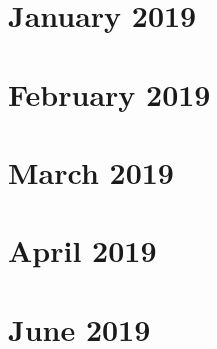 \chapter{January 2019}












\chapter{February 2019}





\chapter{March 2019}



\chapter{April 2019}




\chapter{June 2019}



